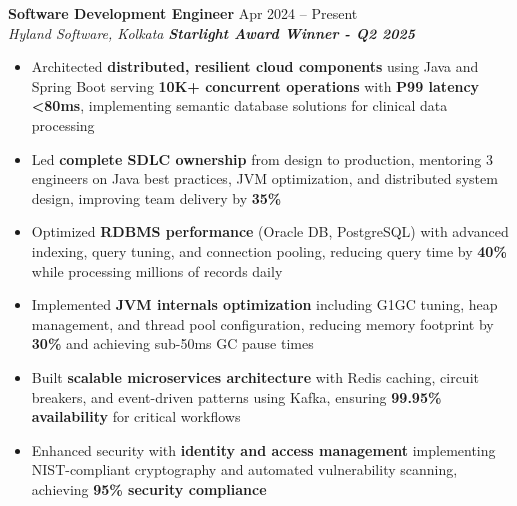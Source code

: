 \documentclass[a4paper,10pt]{article}
\begin{document}
\textbf{Software Development Engineer} \hfill Apr 2024 – Present \\
\textit{Hyland Software, Kolkata} \hfill \textit{\textbf{Starlight Award Winner - Q2 2025}}
\begin{itemize}
    \item Architected \textbf{distributed, resilient cloud components} using Java and Spring Boot serving \textbf{10K+ concurrent operations} with \textbf{P99 latency <80ms}, implementing semantic database solutions for clinical data processing
    \item Led \textbf{complete SDLC ownership} from design to production, mentoring 3 engineers on Java best practices, JVM optimization, and distributed system design, improving team delivery by \textbf{35\%}
    \item Optimized \textbf{RDBMS performance} (Oracle DB, PostgreSQL) with advanced indexing, query tuning, and connection pooling, reducing query time by \textbf{40\%} while processing millions of records daily
    \item Implemented \textbf{JVM internals optimization} including G1GC tuning, heap management, and thread pool configuration, reducing memory footprint by \textbf{30\%} and achieving sub-50ms GC pause times
    \item Built \textbf{scalable microservices architecture} with Redis caching, circuit breakers, and event-driven patterns using Kafka, ensuring \textbf{99.95\% availability} for critical workflows
    \item Enhanced security with \textbf{identity and access management} implementing NIST-compliant cryptography and automated vulnerability scanning, achieving \textbf{95\% security compliance}
\end{itemize}

\vspace{1pt}
\end{document}
